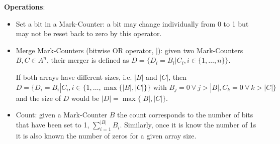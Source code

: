 {\bf Operations}:
\begin{itemize}
	\item Set a bit in a Mark-Counter: a bit may change individually from 0 to 1 but may not be reset back to zero by this operator.
	
	\item Merge Mark-Counters (bitwise OR operator, |): given two Mark-Counters $B, C \in A^{n}$, their merger is defined as $D = \{D_{i} = B_{i} | C_{i}, i \in \{1,\dots, n\}\}$.
	
	If both arrays have different sizes, i.e. $|B|$ and $|C|$, then $D = \{D_{i} = B_{i} | C_{i}, i \in \{1,\dots, \max{\{|B|, |C|\}}\} \text{ with } B_{j} = 0 ~ \forall ~ j > |B|, C_{k} = 0 ~ \forall ~ k > |C|\}$ and the size of $D$ would be $|D| = \max{\{|B|, |C|\}}$.
	
	\item Count: given a Mark-Counter $B$ the count corresponds to the number of bits that have been set to 1, $\sum^{|B|}_{i = 1} B_{i}$. Similarly, once it is know the number of 1s it is also known the number of zeros for a given array size.
\end{itemize}


